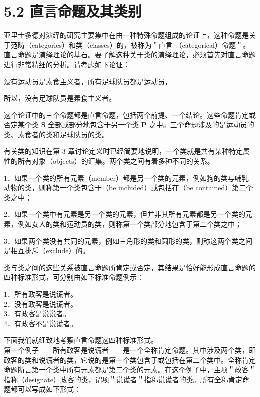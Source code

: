 \section*{5.2 直言命题及其类别}
亚里士多德对演绎的研究主要集中在由一种特殊命题组成的论证上，这种命题是关于范畴（categories）和类（classes）的，被称为＂直言 （categorical）命题＂。直言命题是演绎理论的基石。要了解这种关于类的演绎理论，必须首先对直言命题进行非常精细的分析。请考虑如下论证：

\begin{displayquote}
没有运动员是素食主义者，所有足球队员都是运动员，
\end{displayquote}

\begin{displayquote}
所以，没有足球队员是素食主义者。
\end{displayquote}

这个论证中的三个命题都是直言命题，包括两个前提、一个结论。这些命题肯定或否定某个类 $\boldsymbol{S}$ 全部或部分地包含于另一个类 $\boldsymbol{P}$ 之中。三个命题涉及的是运动员的类、素食者的类和足球队员的类。

有关类的知识在第 3 章讨论定义时已经简要地说明，一个类就是共有某种特定属性的所有对象（objects）的汇集。两个类之间有着多种不同的关系。

1．如果一个类的所有元素（member）都是另一个类的元素，例如狗的类与哺乳动物的类，则称第一个类包含于（be included）或包括在（be contained）第二个类之中；

2．如果一个类中有元素是另一个类的元素，但并非其所有元素都是另一个类的元素，例如女人的类和运动员的类，则称第一个类部分地包含于第二个类之中；

3．如果两个类没有共同的元素，例如三角形的类和圆形的类，则称这两个类之间是相互排斥（exclude）的。

类与类之间的这些关系被直言命题所肯定或否定，其结果是恰好能形成直言命题的四种标准形式，可分别由如下标准命题例示：

1．所有政客是说谎者。\\
2．没有政客是说谎者。\\
3．有政客是说说者。\\
4．有政客不是说谎者。

下面我们就细致地考察直言命题这四种标准形式。\\
第一个例子——所有政客是说谎者——是一个全称肯定命题。其中涉及两个类，即政客的类和说谎者的类，它说的是第一个类包含于或包括在第二个类中。全称肯定命题断言第一个类中所有元素都是第二个类的元素。在这个例子中，主项＂政客＂指称（designate）政客的类，谓项＂说谎者＂指称说谎者的类。所有全称肯定命题都可以写成如下形式：

